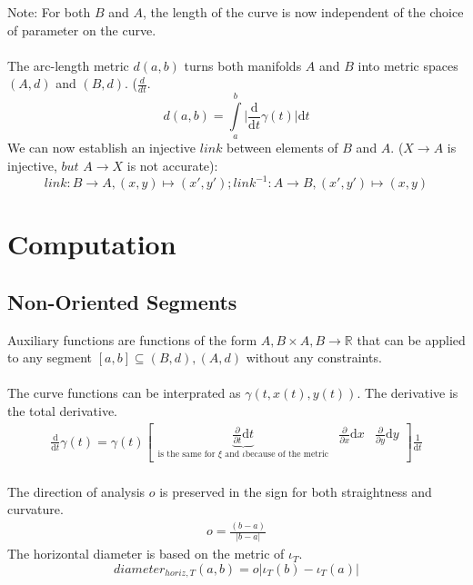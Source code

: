 \documentclass{report}
\begin{document}
Note: For both $B$ and $A$, the length of the curve is now independent of the choice of parameter on the curve. ~\cite[]{Taimanov}\\\\
The arc-length metric $d(a,b)$ turns both manifolds $A$ and $B$ into metric spaces $(A,d)$ and $(B,d)$. ($\frac{d}{dt}$. ~\cite[.3]{Klingenberg}
\begin{equation}
d(a,b) = \int \limits _{a}^{b}\lvert \frac{\mathrm{d}}{\mathrm{d}t}\gamma(t)\rvert \mathrm{d}t
\end{equation}
We can now establish an injective $link$ between elements of $B$ and $A$. ($X \rightarrow A$ is injective, $but$ $A \rightarrow X$ is not accurate):
\begin{equation}
link: B \rightarrow A, (x,y) \mapsto (x',y'); link^{-1}: A \rightarrow B, (x',y') \mapsto (x,y)
\end{equation}

\chapter{Computation}

\section{Non-Oriented Segments}
Auxiliary functions are functions of the form $A,B \times A,B \rightarrow \mathbb{R}$ that can be applied to any segment $[a,b] \subseteq (B,d),(A,d)$ without any constraints.\\\\
The curve functions can be interprated as $\gamma(t,x(t),y(t))$. The derivative is the total derivative.
\begin{align}
\frac{\mathrm{d}}{\mathrm{d} t} \gamma (t) = \gamma(t) \begin{bmatrix} \underbrace{\frac{\partial}{\partial t} \mathrm{d} t}_{\text{is the same for } \xi \text{ and } \iota \text{because of the metric}} & \frac{\partial}{\partial x}  \mathrm{d} x & \frac{\partial}{\partial y} \mathrm{d} y \end{bmatrix} \frac{1}{\mathrm{d}t}
\end{align}\\
The direction of analysis $o$ is preserved in the sign for both straightness and curvature.
\begin{align}
o = \frac{(b-a)}{\lvert b-a \rvert}
\end{align}
The horizontal diameter is based on the metric of $\iota_{T}$.
\begin{equation}
diameter_{horiz,T}(a,b)= o \lvert \iota_{T}(b) - \iota_{T}(a) \rvert
\end{equation}
\end{document}
